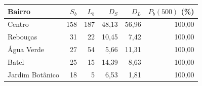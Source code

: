 \begin{tabular}{lrrrrr}
\toprule
Bairro & $S_b$ & $L_b$ & $D_S$ & $D_L$ & $P_b(500)$ (\%) \\
\midrule
Centro & 158 & 187 & 48,13 & 56,96 & 100,00 \\
Rebouças & 31 & 22 & 10,45 & 7,42 & 100,00 \\
Água Verde & 27 & 54 & 5,66 & 11,31 & 100,00 \\
Batel & 25 & 15 & 14,39 & 8,63 & 100,00 \\
Jardim Botânico & 18 & 5 & 6,53 & 1,81 & 100,00 \\
\bottomrule
\end{tabular}
